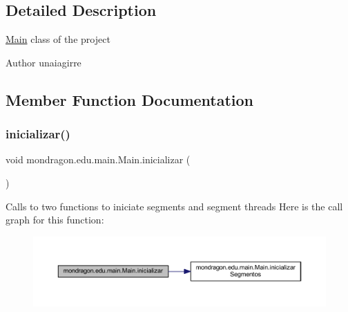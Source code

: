 \subsection{Detailed Description}
\mbox{\hyperlink{classmondragon_1_1edu_1_1main_1_1_main}{Main}} class of the project

\begin{DoxyAuthor}{Author}
unaiagirre 
\end{DoxyAuthor}


\subsection{Member Function Documentation}
\mbox{\label{classmondragon_1_1edu_1_1main_1_1_main_a16bc67d233e57a27e356f84c214f09a8}} 
\subsubsection{\texorpdfstring{inicializar()}{inicializar()}}
{\footnotesize\ttfamily void mondragon.\+edu.\+main.\+Main.\+inicializar (\begin{DoxyParamCaption}{ }\end{DoxyParamCaption})\hspace{0.3cm}{\ttfamily [inline]}}

Calls to two functions to iniciate segments and segment threads Here is the call graph for this function\+:\nopagebreak
\begin{figure}[H]
\begin{center}
\leavevmode
\includegraphics[width=350pt]{classmondragon_1_1edu_1_1main_1_1_main_a16bc67d233e57a27e356f84c214f09a8_cgraph}
\end{center}
\end{figure}
\mbox{\label{classmondragon_1_1edu_1_1main_1_1_main_a31f9a39c9349efab4a8addeb531d4669}} 
